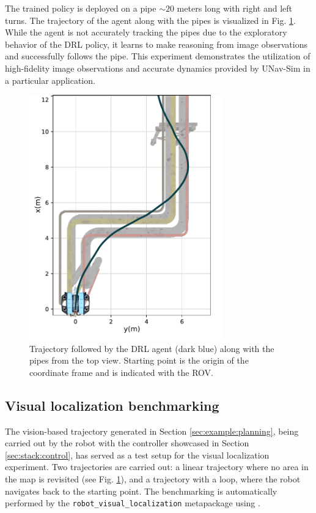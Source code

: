 The trained policy is deployed on a pipe $\sim20$ meters long with right and left turns. The trajectory of the agent along with the pipes is visualized in Fig. \ref{fig:trajectory_drl}.
While the agent is not accurately tracking the pipes due to the exploratory behavior of the \ac{DRL} policy, it learns to make reasoning from image observations and successfully follows the pipe.
This experiment demonstrates the utilization of high-fidelity image observations and accurate dynamics provided by UNav-Sim in a particular application.

\begin{figure}[t]
    \centering
    \includegraphics[width=8.4cm]{figures/trajectory2.pdf}
    \caption{Trajectory followed by the \ac{DRL} agent (dark blue) along with the pipes from the top view. Starting point is the origin of the coordinate frame and is indicated with the \ac{ROV}.
    }
    \label{fig:trajectory_drl}
\end{figure}



\subsection{Visual localization benchmarking}
The vision-based trajectory generated in Section \ref{sec:example:planning}, being carried out by the robot with the controller showcased in Section \ref{sec:stack:control}, has served as a test setup for the visual localization experiment.
Two trajectories are carried out: a linear trajectory where no area in the map is revisited (see Fig. \ref{fig:trajectory_drl}), and a trajectory with a loop, where the robot navigates back to the starting point.
The benchmarking is automatically performed by the \texttt{robot\_visual\_localization} metapackage using \cite{vSLAM:evo}. 

